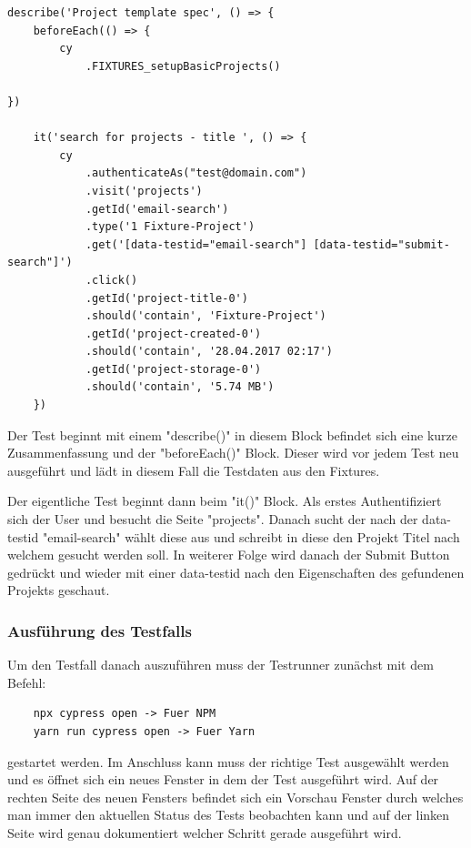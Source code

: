 \begin{lstlisting}
describe('Project template spec', () => {
    beforeEach(() => {
        cy
            .FIXTURES_setupBasicProjects()

})
    
    it('search for projects - title ', () => {
        cy
            .authenticateAs("test@domain.com")
            .visit('projects')
            .getId('email-search')
            .type('1 Fixture-Project')
            .get('[data-testid="email-search"] [data-testid="submit-search"]')
            .click()
            .getId('project-title-0')
            .should('contain', 'Fixture-Project')
            .getId('project-created-0')
            .should('contain', '28.04.2017 02:17')
            .getId('project-storage-0')
            .should('contain', '5.74 MB')
    })
\end{lstlisting}

Der Test beginnt mit einem "describe()" in diesem Block befindet sich eine kurze Zusammenfassung und der "beforeEach()" Block. Dieser wird vor jedem Test neu ausgeführt und lädt in diesem Fall die Testdaten aus den Fixtures.

Der eigentliche Test beginnt dann beim "it()" Block. Als erstes Authentifiziert sich der User und besucht die Seite "projects". Danach sucht der nach der data-testid "email-search" wählt diese aus und schreibt in diese den Projekt Titel nach welchem gesucht werden soll. In weiterer Folge wird danach der Submit Button gedrückt und wieder mit einer data-testid nach den Eigenschaften des gefundenen Projekts geschaut.

\subsubsection{Ausführung des Testfalls}

Um den Testfall danach auszuführen muss der Testrunner zunächst mit dem Befehl:

\begin{lstlisting}
    npx cypress open -> Fuer NPM
    yarn run cypress open -> Fuer Yarn
\end{lstlisting}

gestartet werden.
Im Anschluss kann muss der richtige Test ausgewählt werden und es öffnet sich ein neues Fenster in dem der Test ausgeführt wird. Auf der rechten Seite des neuen Fensters befindet sich ein Vorschau Fenster durch welches man immer den aktuellen Status des Tests beobachten kann und auf der linken Seite wird genau dokumentiert welcher Schritt gerade ausgeführt wird.

